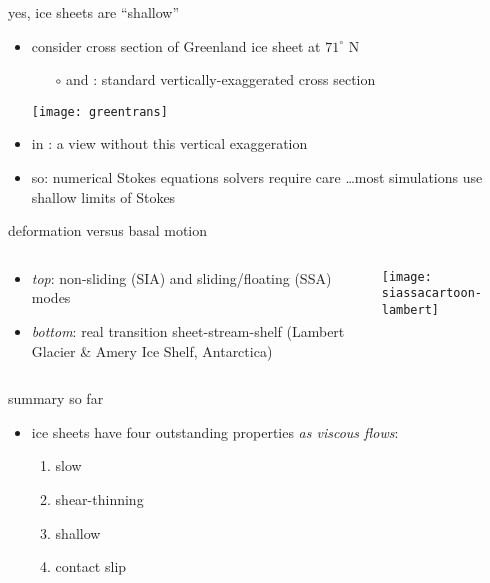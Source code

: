 \documentclass{beamer}
\begin{document}
\begin{frame}{yes, ice sheets are ``shallow''}

\begin{itemize}
\item consider cross section of Greenland ice sheet at $71^\circ$ N
\small
  \begin{itemize}
  \item[$\circ$] {\color{dark green}{green}} and {\color{dark blue}{blue}}: standard vertically-exaggerated cross section
  \end{itemize}
  \begin{center}
    \texttt{[image: greentrans]}
  \end{center}
\normalsize
\item in {\color{dark red}{red}}: a view without this vertical exaggeration
\item so: numerical Stokes equations solvers require care \dots most simulations use shallow limits of Stokes
\end{itemize}
\end{frame}


\begin{frame}{deformation versus basal motion}

\begin{columns}
\begin{column}{0.35\textwidth}
\small
\begin{itemize}
\item \emph{top}:  non-sliding (SIA) and sliding/floating (SSA) modes
\item \emph{bottom}:  real transition sheet-stream-shelf (Lambert Glacier \& Amery Ice Shelf, Antarctica)
\end{itemize}
\end{column}

\begin{column}{0.65\textwidth}
\texttt{[image: siassacartoon-lambert]}
\end{column}
\end{columns}
\end{frame}


\begin{frame}{summary so far}

\begin{itemize}
\item ice sheets have four outstanding properties \emph{as viscous flows}:
  \begin{enumerate}
  \item \alert{slow}
  \item \alert{shear-thinning}
  \item \alert{shallow}
  \item \alert{contact slip}
  \end{enumerate}
\end{itemize}
\end{frame}
\end{document}
